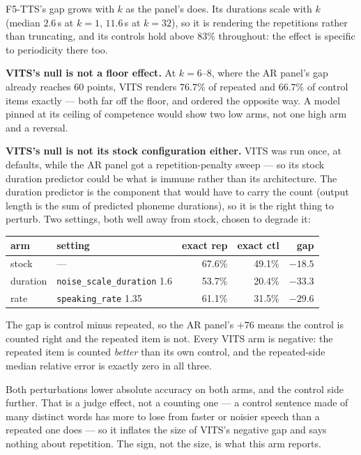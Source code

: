 \documentclass[11pt]{article}
\begin{document}
F5-TTS's gap grows with $k$ as the panel's does. Its durations scale with $k$
(median $2.6$\,s at $k\!=\!1$, $11.6$\,s at $k\!=\!32$), so it is rendering the
repetitions rather than truncating, and its controls hold above $83\%$
throughout: the effect is specific to periodicity there too.

\noindent\textbf{VITS's null is not a floor effect.} At $k=6\text{--}8$, where the
AR panel's gap already reaches $60$ points, VITS renders $76.7\%$ of repeated and
$66.7\%$ of control items exactly --- both far off the floor, and ordered the
opposite way. A model pinned at its ceiling of competence would show two low arms,
not one high arm and a reversal.

\noindent\textbf{VITS's null is not its stock configuration either.} VITS was
run once, at defaults, while the AR panel got a repetition-penalty sweep --- so
its stock duration predictor could be what is immune rather than its
architecture. The duration predictor is the component that would have to carry
the count (output length is the sum of predicted phoneme durations), so it is the
right thing to perturb. Two settings, both well away from stock, chosen to
degrade it:

\begin{center}
\begin{tabular}{llrrr}
\toprule
arm & setting & exact rep & exact ctl & gap \\
\midrule
stock     & ---                          & 67.6\% & 49.1\% & $-18.5$ \\
duration  & \texttt{noise\_scale\_duration} 1.6 & 53.7\% & 20.4\% & $-33.3$ \\
rate      & \texttt{speaking\_rate} 1.35        & 61.1\% & 31.5\% & $-29.6$ \\
\bottomrule
\end{tabular}
\end{center}

\noindent The gap is control minus repeated, so the AR panel's $+76$ means the
control is counted right and the repeated item is not. Every VITS arm is
negative: the repeated item is counted \emph{better} than its own control, and
the repeated-side median relative error is exactly zero in all three.

Both perturbations lower absolute accuracy on both arms, and the control side
further. That is a judge effect, not a counting one --- a control sentence made
of many distinct words has more to lose from faster or noisier speech than a
repeated one does --- so it inflates the size of VITS's negative gap and says
nothing about repetition. The sign, not the size, is what this arm reports.
\end{document}
